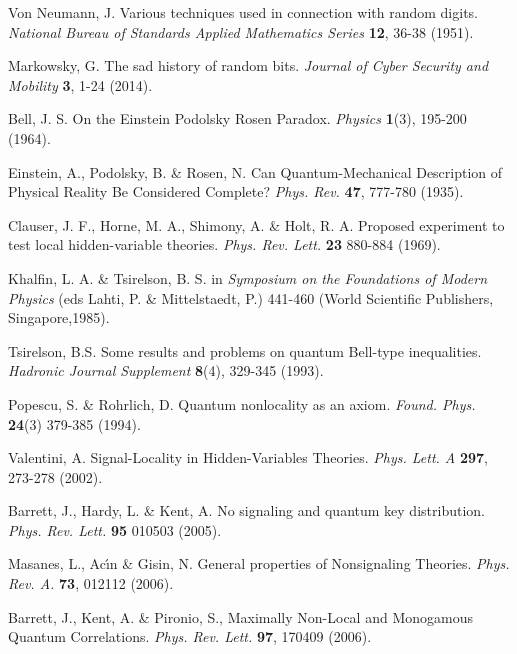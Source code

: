\documentclass[11pt,a4paper]{article}
\begin{document}
{\begin{thebibliography}{99}
Von Neumann, J. Various techniques used in connection with random digits. \textit{National Bureau of Standards Applied Mathematics Series} \textbf{12}, 36-38 (1951).

Markowsky, G. The sad history of random bits. \textit{Journal of Cyber Security and Mobility} \textbf{3}, 1-24 (2014).

Bell, J. S. On the Einstein Podolsky Rosen Paradox. \textit{Physics} \textbf{1}(3), 195-200 (1964).%

Einstein, A., Podolsky, B. \& Rosen, N. Can Quantum-Mechanical Description of Physical Reality Be Considered Complete? \textit{Phys. Rev.} \textbf{47}, 777-780 (1935).

Clauser, J. F., Horne, M. A., Shimony, A. \& Holt, R. A. Proposed experiment to test local hidden-variable theories. \textit{Phys.
Rev. Lett.} {\bf 23} 880-884 (1969).

Khalfin, L. A. \& Tsirelson, B. S. %
in \textit{Symposium on the Foundations of Modern Physics} (eds Lahti, P. \& Mittelstaedt, P.) 441-460 (World Scientific Publishers, Singapore,1985).

Tsirelson, B.S. Some results and problems on quantum Bell-type inequalities. \textit{Hadronic Journal Supplement} \textbf{8}(4), 329-345 (1993).

Popescu, S. \& Rohrlich, D. Quantum nonlocality as an axiom. \textit{Found. Phys.} \textbf{24}(3) 379-385 (1994).

Valentini, A. Signal-Locality in Hidden-Variables Theories. \textit{Phys. Lett. A} \textbf{297}, 273-278 (2002).

 Barrett, J., Hardy, L. \& Kent, A. No signaling and quantum key distribution. \textit{Phys. Rev. Lett.} {\bf 95} 010503 (2005).

Masanes, L., Ac\'\i n \& Gisin, N. General properties of Nonsignaling Theories.
\textit{Phys. Rev. A.} \textbf{73}, 012112 (2006).

Barrett, J., Kent, A. \& Pironio, S., Maximally Non-Local and Monogamous Quantum Correlations.
\textit{Phys. Rev. Lett.} \textbf{97}, 170409 (2006).


\end{thebibliography}}
\end{document}
